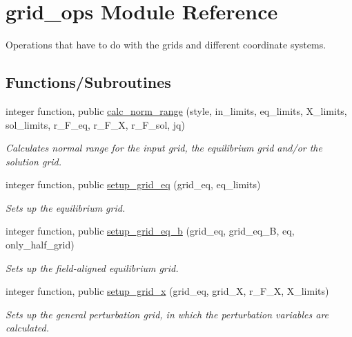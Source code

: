 \hypertarget{namespacegrid__ops}{}\section{grid\+\_\+ops Module Reference}
\label{namespacegrid__ops}


Operations that have to do with the grids and different coordinate systems.  


\subsection*{Functions/\+Subroutines}
\begin{DoxyCompactItemize}
\item 
integer function, public \hyperlink{namespacegrid__ops_a1c18f90f93f5fce7ebb4dba60b70e0f8}{calc\+\_\+norm\+\_\+range} (style, in\+\_\+limits, eq\+\_\+limits, X\+\_\+limits, sol\+\_\+limits, r\+\_\+\+F\+\_\+eq, r\+\_\+\+F\+\_\+X, r\+\_\+\+F\+\_\+sol, jq)
\begin{DoxyCompactList}\small\item\em Calculates normal range for the input grid, the equilibrium grid and/or the solution grid. \end{DoxyCompactList}\item 
integer function, public \hyperlink{namespacegrid__ops_af63366847d1caa64a7d329672292fd34}{setup\+\_\+grid\+\_\+eq} (grid\+\_\+eq, eq\+\_\+limits)
\begin{DoxyCompactList}\small\item\em Sets up the equilibrium grid. \end{DoxyCompactList}\item 
integer function, public \hyperlink{namespacegrid__ops_ad16495ddd320562451c2325bafecf2d8}{setup\+\_\+grid\+\_\+eq\+\_\+b} (grid\+\_\+eq, grid\+\_\+eq\+\_\+B, eq, only\+\_\+half\+\_\+grid)
\begin{DoxyCompactList}\small\item\em Sets up the field-\/aligned equilibrium grid. \end{DoxyCompactList}\item 
integer function, public \hyperlink{namespacegrid__ops_a1047889ec84da6e56aae619570a16988}{setup\+\_\+grid\+\_\+x} (grid\+\_\+eq, grid\+\_\+X, r\+\_\+\+F\+\_\+X, X\+\_\+limits)
\begin{DoxyCompactList}\small\item\em Sets up the general perturbation grid, in which the perturbation variables are calculated. \end{DoxyCompactList}\item 

\end{DoxyCompactItemize}
